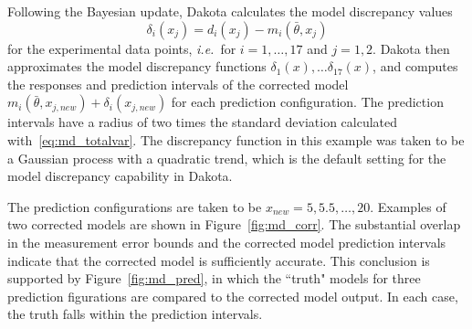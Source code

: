 Following the Bayesian update, Dakota calculates the model discrepancy values
\begin{equation}\label{eq:md_discrep}
\delta_i(x_j) = d_i(x_j) - m_i(\bar{\theta}, x_j)
\end{equation}
for the experimental data points, \textit{i.e.}\ for $i = 1, \ldots, 17$ and
$j = 1,2$. Dakota then approximates the model discrepancy functions 
$\delta_1(x), \ldots \delta_{17}(x)$, and computes the responses and
prediction intervals of the corrected model $m_i(\bar{\theta}, x_{j,new}) 
+ \delta_i(x_{j,new})$ for each prediction configuration. The prediction
intervals have a radius of two times the standard deviation calculated 
with~\ref{eq:md_totalvar}. The discrepancy function in this example was taken
to be a Gaussian process with a quadratic trend, which is the default setting
for the model discrepancy capability in Dakota.

The prediction configurations are taken to be $x_{new} = 5, 5.5, \ldots, 20$. 
Examples of two corrected models are shown in Figure~\ref{fig:md_corr}. The
substantial overlap in the measurement error bounds and the corrected model
prediction intervals indicate that the corrected model is sufficiently accurate.
This conclusion is supported by Figure~\ref{fig:md_pred}, in which the
``truth" models for three prediction figurations are compared to the corrected
model output. In each case, the truth falls within the prediction intervals.

